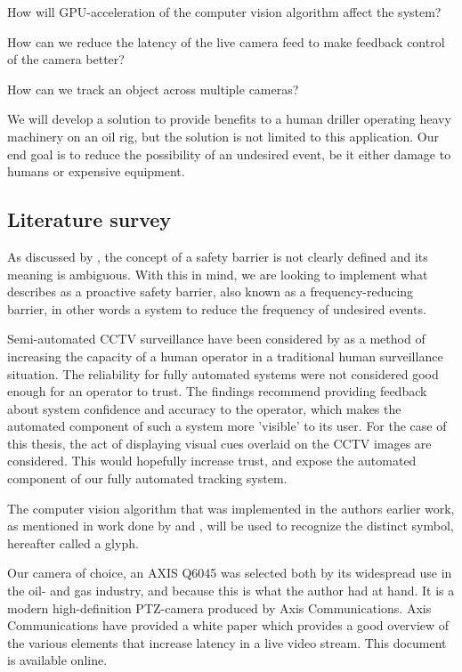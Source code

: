 How will GPU-acceleration of the computer vision algorithm affect the system?

How can we reduce the latency of the live camera feed to make feedback control of the camera better?

How can we track an object across multiple cameras?

We will develop a solution to provide benefits to a human driller operating heavy machinery on an oil rig, but the solution is not limited to this application. Our end goal is to reduce the possibility of an undesired event, be it either damage to humans or expensive equipment.

\subsection{Literature survey}
As discussed by \citet{sklet05}, the concept of a safety barrier is not clearly defined and its meaning is ambiguous. With this in mind, we are looking to implement what \citet{rausand14} describes as a proactive safety barrier, also known as a frequency-reducing barrier, in other words a system to reduce the frequency of undesired events.

Semi-automated CCTV surveillance have been considered by \citet{dadashi12} as a method of increasing the capacity of a human operator in a traditional human surveillance situation. The reliability for fully automated systems were not considered good enough for an operator to trust. The findings recommend providing feedback about system confidence and accuracy to the operator, which makes the automated component of such a system more 'visible' to its user. For the case of this thesis, the act of displaying visual cues overlaid on the CCTV images are considered. This would hopefully increase trust, and expose the automated component of our fully automated tracking system.

The computer vision algorithm that was implemented in the authors earlier work, as mentioned in work done by \citet{boyers13} and \citet{kirillov10}, will be used to recognize the distinct symbol, hereafter called a glyph.

Our camera of choice, an AXIS Q6045 was selected both by its widespread use in the oil- and gas industry, and because this is what the author had at hand. It is a modern high-definition PTZ-camera produced by Axis Communications.  Axis Communications have provided a white paper which provides a good overview of the various elements that increase latency in a live video stream. This document is available online. \citep{axis15}

